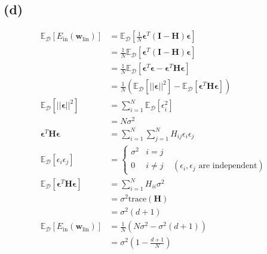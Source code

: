 \documentclass{article}
\begin{document}
	\subsection*{(d)}
		\begin{align*}
			\mathbb E_{\mathcal D}[E_\text{in}(\mathbf w_{\text{lin}})] &= \mathbb E_{\mathcal D}[ \frac1N\bm\epsilon^T(\mathbf I - \mathbf H)\bm\epsilon ]\\
			&= \frac1N\mathbb E_{\mathcal D}[ \bm\epsilon^T(\mathbf I - \mathbf H)\bm\epsilon ]\\
			&= \frac1N\mathbb E_{\mathcal D}[ \bm\epsilon^T\bm\epsilon - \bm\epsilon^T\mathbf H\bm\epsilon ]\\
			&= \frac1N(\mathbb E_{\mathcal D}[||\bm\epsilon||^2] - \mathbb E_{\mathcal D}[\bm\epsilon^T\mathbf H\bm\epsilon])\\
			\mathbb E_{\mathcal D}[||\bm\epsilon||^2] &= \sum\limits_{i=1}^N\mathbb E_{\mathcal D}[\epsilon_i^2]\\
			&=N\sigma^2\\
			\bm\epsilon^T\mathbf H\bm\epsilon &= \sum\limits_{i=1}^N\sum\limits_{j=1}^NH_{ij}\epsilon_i\epsilon_j\\
			\mathbb E_{\mathcal D}[\epsilon_i\epsilon_j] &=
			\begin{cases}
				\sigma^2 &i = j\\
				0 &i \neq j \ \ \ \ \ (\epsilon_i, \epsilon_j \text{ are independent})
			\end{cases}\\
			\mathbb E_{\mathcal D}[\bm\epsilon^T\mathbf H\bm\epsilon] &= \sum\limits_{i = 1}^NH_{ii}\sigma^2\\
			&= \sigma^2\text{trace}(\mathbf H)\\
			&= \sigma^2(d+1)\\
			\mathbb E_{\mathcal D}[E_\text{in}(\mathbf w_{\text{lin}})] &= \frac1N(N\sigma^2 - \sigma^2(d+1))\\
			&= \sigma^2(1 - \frac{d+1}N)
		\end{align*}
		
\end{document}
